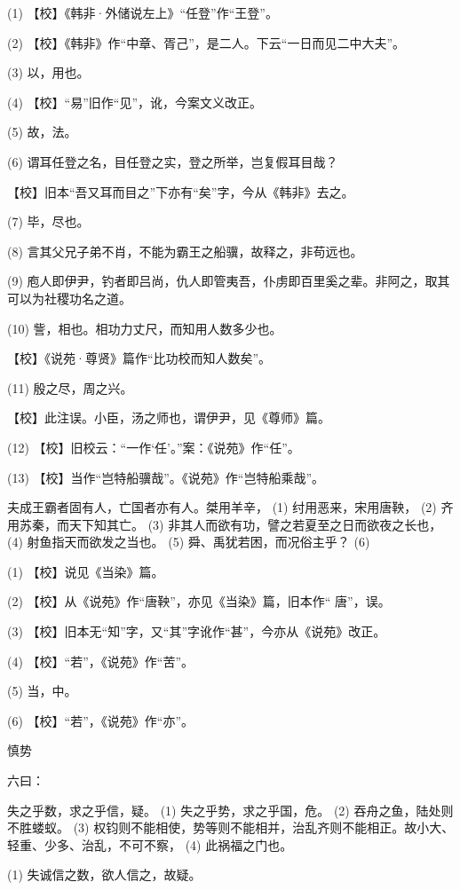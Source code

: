 \documentclass[12pt,UTF8]{ctexbook}
\begin{document}
(1) 【校】《韩非·外储说左上》“任登”作“王登”。

(2) 【校】《韩非》作“中章、胥己”，是二人。下云“一日而见二中大夫”。

(3) 以，用也。

(4) 【校】“易”旧作“见”，讹，今案文义改正。

(5) 故，法。

(6) 谓耳任登之名，目任登之实，登之所举，岂复假耳目哉？

【校】旧本“吾又耳而目之”下亦有“矣”字，今从《韩非》去之。

(7) 毕，尽也。

(8) 言其父兄子弟不肖，不能为霸王之船骥，故释之，非苟远也。

(9) 庖人即伊尹，钓者即吕尚，仇人即管夷吾，仆虏即百里奚之辈。非阿之，取其可以为社稷功名之道。

(10) 訾，相也。相功力丈尺，而知用人数多少也。

【校】《说苑·尊贤》篇作“比功校而知人数矣”。

(11) 殷之尽，周之兴。

【校】此注误。小臣，汤之师也，谓伊尹，见《尊师》篇。

(12) 【校】旧校云：“一作‘任’。”案：《说苑》作“任”。

(13) 【校】当作“岂特船骥哉”。《说苑》作“岂特船乘哉”。

夫成王霸者固有人，亡国者亦有人。桀用羊辛， (1) 纣用恶来，宋用唐鞅， (2) 齐用苏秦，而天下知其亡。 (3) 非其人而欲有功，譬之若夏至之日而欲夜之长也， (4) 射鱼指天而欲发之当也。 (5) 舜、禹犹若困，而况俗主乎？ (6)

(1) 【校】说见《当染》篇。

(2) 【校】从《说苑》作“唐鞅”，亦见《当染》篇，旧本作“ 唐”，误。

(3) 【校】旧本无“知”字，又“其”字讹作“甚”，今亦从《说苑》改正。

(4) 【校】“若”，《说苑》作“苦”。

(5) 当，中。

(6) 【校】“若”，《说苑》作“亦”。





慎势


六曰：

失之乎数，求之乎信，疑。 (1) 失之乎势，求之乎国，危。 (2) 吞舟之鱼，陆处则不胜蝼蚁。 (3) 权钧则不能相使，势等则不能相并，治乱齐则不能相正。故小大、轻重、少多、治乱，不可不察， (4) 此祸福之门也。

(1) 失诚信之数，欲人信之，故疑。
\end{document}
